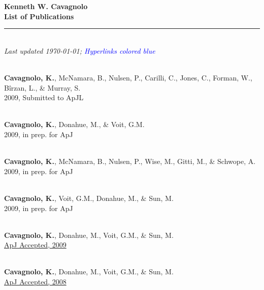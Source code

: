 \documentclass[12pt]{cv}
\begin{document}
\begin{center}
{\large \textbf{Kenneth W. Cavagnolo\\List of Publications}}\\
\rule{17.35cm}{2pt}\\
\footnotesize
{\it Last updated \today; \textcolor{blue}{Hyperlinks colored blue}}
\normalsize
\end{center}

\begin{llist}



{}\\
{\bf Cavagnolo, K.}, McNamara, B., Nulsen, P., Carilli, C., Jones, C., Forman, W.,
B\^irzan, L., \& Murray, S.\\
2009, Submitted to ApJL

{}\\
{\bf Cavagnolo, K.}, Donahue, M., \& Voit, G.M.\\
2009, in prep. for ApJ

{}\\
{\bf Cavagnolo, K.}, McNamara, B., Nulsen, P., Wise, M., Gitti, M., \& Schwope, A.\\
2009, in prep. for ApJ

{}\\
{\bf Cavagnolo, K.}, Voit, G.M., Donahue, M., \& Sun, M.\\
2009, in prep. for ApJ

{}\\
{\bf Cavagnolo, K.}, Donahue, M., Voit, G.M., \& Sun, M.\\
\href{http://adsabs.harvard.edu/abs/2009ApJS..182...12C}{ApJ Accepted, 2009}

{}\\
{\bf Cavagnolo, K.}, Donahue, M., Voit, G.M., \& Sun, M.\\
\href{http://adsabs.harvard.edu/abs/2008ApJ...683L.107C}{ApJ Accepted, 2008}


\end{llist}
\end{document}
